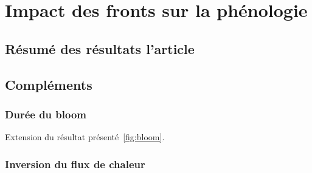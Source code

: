 
\chapter{Impact des fronts sur la phénologie}
\addChpLof
\label{chp:res-phenologie}
\graphicspath{{resources/res_phénologie}}

\minitoc%
\clearpage

\section{Résumé des résultats l'article}
\label{sec:resume-res-phenologie}

\section{Compléments}
\label{sec:complements-phenologie}

\subsection{Durée du bloom}
\label{sec:duree-bloom}

Extension du résultat présenté~\cref{fig:bloom}.

\begin{figure}
  \centering
  \label{fig:duree-bloom}
\end{figure}

\subsection{Inversion du flux de chaleur}
\label{sec:flux-chaleur}
